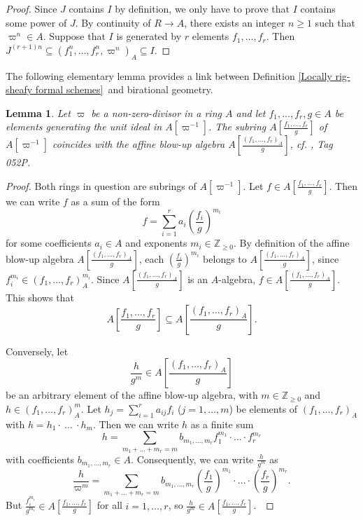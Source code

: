 \documentclass[12pt,twoside,a4paper]{article}
\newtheorem{lemma}[thm]{Lemma}
\theoremstyle{definition}
\theoremstyle{remark}
\begin{document}
\begin{proof}Since $J$ contains $I$ by definition, we only have to prove that $I$ contains some power of $J$. By continuity of $R\to A$, there exists an integer $n\geq1$ such that $\varpi^{n}\in A$. Suppose that $I$ is generated by $r$ elements $f_1,\dots, f_r$. Then $J^{(r+1)n}\subseteq (f_1^{n},\dots, f_r^{n}, \varpi^{n})_{A}\subseteq I$.\end{proof}
The following elementary lemma provides a link between Definition \ref{Locally rig-sheafy formal schemes} and birational geometry.
\begin{lemma}\label{Affine blow-up algebras}Let $\varpi$ be a non-zero-divisor in a ring $A$ and let $f_1,\dots, f_r, g\in A$ be elements generating the unit ideal in $A[\varpi^{-1}]$. The subring $A[\frac{f_1,\dots,f_r}{g}]$ of $A[\varpi^{-1}]$ coincides with the affine blow-up algebra $A[\frac{(f_1,\dots, f_r)_{A}}{g}]$, cf. \cite{Stacks}, Tag 052P.\end{lemma}
\begin{proof}Both rings in question are subrings of $A[\varpi^{-1}]$. Let $f\in A[\frac{f_1,\dots, f_r}{g}]$. Then we can write $f$ as a sum of the form \begin{equation*}f=\sum_{i=1}^{r}a_{i}(\frac{f_i}{g})^{m_{i}}\end{equation*}for some coefficients $a_i\in A$ and exponents $m_i\in\mathbb{Z}_{\geq0}$. By definition of the affine blow-up algebra $A[\frac{(f_1,\dots, f_r)_{A}}{g}]$, each $(\frac{f_{i}}{g})^{m_i}$ belongs to $A[\frac{(f_1,\dots, f_r)_{A}}{g}]$, since $f_{i}^{m_{i}}\in (f_1,\dots, f_r)_{A}^{m_{i}}$. Since $A[\frac{(f_1,\dots, f_r)_{A}}{g}]$ is an $A$-algebra, $f\in A[\frac{(f_1,\dots, f_r)_{A}}{g}]$. This shows that \begin{equation*}A[\frac{f_1,\dots, f_r}{g}]\subseteq A[\frac{(f_1,\dots, f_r)_{A}}{g}].\end{equation*}

Conversely, let \begin{equation*}\frac{h}{g^{m}}\in A[\frac{(f_1,\dots, f_r)_{A}}{g}]\end{equation*}be an arbitrary element of the affine blow-up algebra, with $m\in\mathbb{Z}_{\geq0}$ and $h\in (f_1,\dots, f_r)_{A}^{m}$. Let $h_{j}=\sum_{i=1}^{r}a_{ij}f_{i}$ ($j=1,\dots, m$) be elements of $(f_1,\dots, f_r)_{A}$ with $h=h_{1}\cdot~\dots~\cdot h_{m}$. Then we can write $h$ as a finite sum \begin{equation*}h=\sum_{m_1+\dots+m_r=m}b_{m_1,\dots, m_r}f_{1}^{m_{1}}\cdot\dots\cdot f_r^{m_{r}}\end{equation*}with coefficients $b_{m_1,\dots, m_r}\in A$. Consequently, we can write $\frac{h}{g^{m}}$ as \begin{equation*}\frac{h}{\varpi^{m}}=\sum_{m_1+\dots+m_r=m}b_{m_1,\dots,m_r}(\frac{f_1}{g})^{m_1}\cdot\dots\cdot (\frac{f_r}{g})^{m_r}.\end{equation*}But $\frac{f_{i}^{m_{i}}}{g^{m_{i}}}\in A[\frac{f_1,\dots, f_r}{g}]$ for all $i=1,\dots, r$, so $\frac{h}{g^{m}}\in A[\frac{f_1,\dots, f_r}{g}]$. \end{proof}
\end{document}

